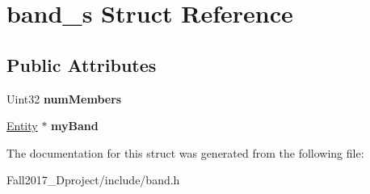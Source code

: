 \hypertarget{structband__s}{}\section{band\+\_\+s Struct Reference}
\label{structband__s}
\subsection*{Public Attributes}
\begin{DoxyCompactItemize}
\item 
\mbox{\label{structband__s_ac45227e21148ce55cf0462b8ae879a42}} 
Uint32 {\bfseries num\+Members}
\item 
\mbox{\label{structband__s_a5a9e77176de62784ea5136b98d33457f}} 
\hyperlink{structentity__s}{Entity} $\ast$ {\bfseries my\+Band}
\end{DoxyCompactItemize}


The documentation for this struct was generated from the following file\+:\begin{DoxyCompactItemize}
\item 
Fall2017\+\_\+Dproject/include/band.\+h\end{DoxyCompactItemize}
